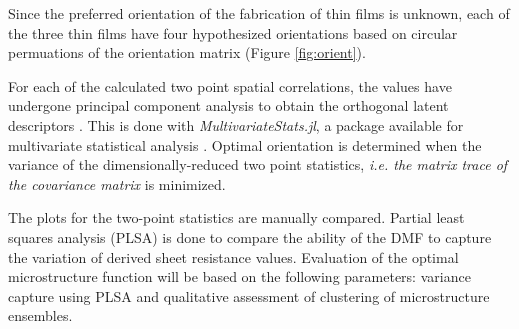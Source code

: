 Since the preferred orientation of the fabrication of thin films is unknown, each of the three thin films have four hypothesized orientations based on circular permuations of the orientation matrix (Figure \ref{fig:orient}).

For each of the calculated two point spatial correlations, the values have undergone principal component analysis to obtain the orthogonal latent descriptors \cite{gupta15, sun17}.
This is done with \emph{MultivariateStats.jl}, a package available for multivariate statistical analysis \cite{mvstats}.
Optimal orientation is determined when the variance of the dimensionally-reduced two point statistics, \textit{i.e. the matrix trace of the covariance matrix} is minimized.

The plots for the two-point statistics are manually compared.
Partial least squares analysis (PLSA) is done to compare the ability of the DMF to capture the variation of derived sheet resistance values.
Evaluation of the optimal microstructure function will be based on the following parameters: variance capture using PLSA and qualitative assessment of clustering of microstructure ensembles.
